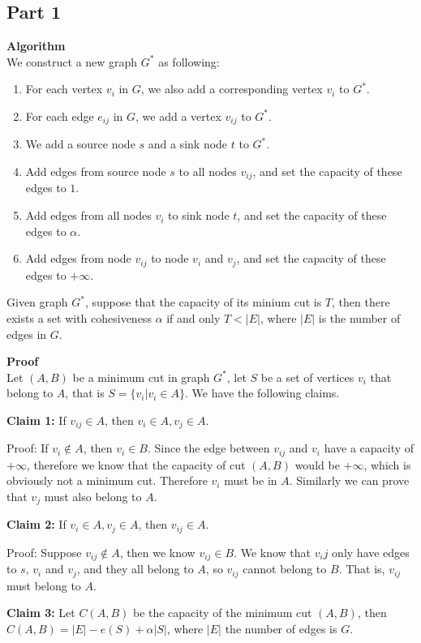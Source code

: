 \documentclass{article}
\newcommand{\Proof}{\vspace{0.3cm} \noindent\textbf{Proof} \\}
\newcommand{\Algorithm}{\textbf{Algorithm} \\}
\begin{document}
\subsection*{Part 1}
\Algorithm
We construct a new graph $G^*$ as following:
\begin{enumerate}
  \item For each vertex $v_i$ in $G$, we also add a corresponding vertex $v_i$ to $G^*$.
  \item For each edge $e_{ij}$ in $G$, we add a vertex $v_{ij}$ to $G^*$.  
  \item We add a source node $s$ and a sink node $t$ to $G^*$.
  \item Add edges from source node $s$ to all nodes $v_{ij}$, and set the capacity of
    these edges to $1$.
  \item Add edges from all nodes $v_i$ to sink node $t$, and set the capacity of these edges to
    $\alpha$.
  \item Add edges from node $v_{ij}$ to node $v_i$ and $v_j$, and set the capacity of these edges
   to $+\infty$.   
\end{enumerate}
Given graph $G^*$, suppose that the capacity of its minium cut is $T$, then there exists a
set with cohesiveness $\alpha$ if and only $T < |E|$, where $|E|$ is the number of edges in $G$. 

\Proof
Let $(A, B)$ be a minimum cut in graph $G^*$, let $S$ be a set of vertices $v_i$ that belong to $A$,
that is $S = \{v_i | v_i \in A \}$. We have the following claims.

\textbf{Claim 1:} If $v_{ij}\in A$, then $v_i \in A, v_j \in A$.

Proof: If $v_i \notin A$, then $v_i \in B$. Since the edge between $v_{ij}$ and $v_i$ have a
capacity of $+\infty$, therefore we know that the capacity of cut $(A, B)$ would be $+\infty$, which
is obviously not a minimum cut. Therefore $v_i$ must be in $A$. Similarly we can prove that $v_j$
must also belong to $A$.   

\textbf{Claim 2:} If $v_i \in A, v_j \in A$, then $v_{ij} \in A$.

Proof: Suppose $v_{ij} \notin A$, then we know $v_{ij} \in B$. We know that $v_ij$ only have edges
to $s$, $v_i$ and $v_j$, and they all belong to $A$, so $v_{ij}$ cannot belong to $B$. That is,
$v_{ij}$ must belong to $A$. 

\textbf{Claim 3:} Let $C(A, B)$ be the capacity of the minimum cut $(A,B)$, then $C(A, B) = |E| -
e(S) + \alpha|S|$, where $|E|$ the number of edges is $G$. 
\end{document}
